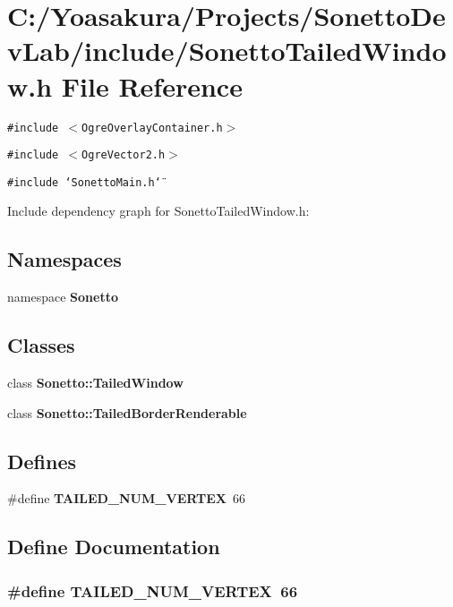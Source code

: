 \section{C:/Yoasakura/Projects/SonettoDevLab/include/SonettoTailedWindow.h File Reference}
\label{_sonetto_tailed_window_8h}
{\tt \#include $<$OgreOverlayContainer.h$>$}\par
{\tt \#include $<$OgreVector2.h$>$}\par
{\tt \#include \char`\"{}SonettoMain.h\char`\"{}}\par


Include dependency graph for SonettoTailedWindow.h:\subsection*{Namespaces}
\begin{CompactItemize}
\item 
namespace {\bf Sonetto}
\end{CompactItemize}
\subsection*{Classes}
\begin{CompactItemize}
\item 
class {\bf Sonetto::TailedWindow}
\item 
class {\bf Sonetto::TailedBorderRenderable}
\end{CompactItemize}
\subsection*{Defines}
\begin{CompactItemize}
\item 
\#define {\bf TAILED\_\-NUM\_\-VERTEX}~66
\end{CompactItemize}


\subsection{Define Documentation}
\subsubsection{\setlength{\rightskip}{0pt plus 5cm}\#define TAILED\_\-NUM\_\-VERTEX~66}\label{_sonetto_tailed_window_8h_bc4ca42fca74955e2d74da1c0d347a6f}


